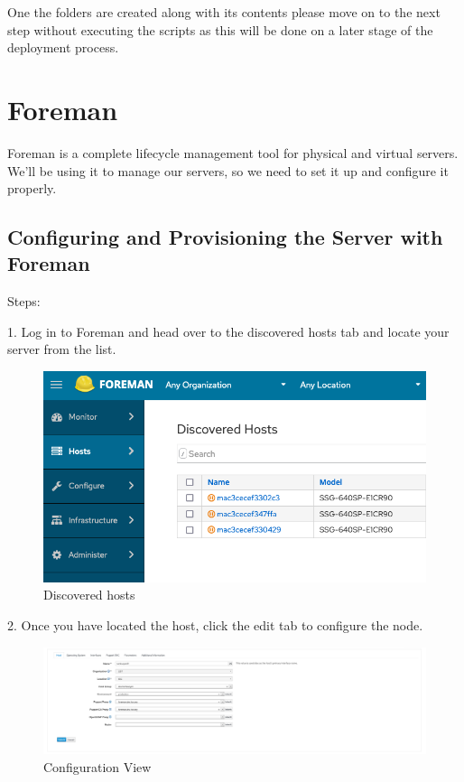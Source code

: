 One the folders are created along with its contents please move on to the next step without executing the scripts as this will be done on a later stage of the deployment process.


\vfill\eject


\section{Foreman}

Foreman is a complete lifecycle management tool for physical and virtual servers. We'll be using it to manage our servers, so we need to set it up and configure it properly.

\subsection{Configuring and Provisioning the Server with Foreman}

Steps:

1. Log in to Foreman and head over to the discovered hosts tab and locate your server from the list.

\begin{figure}
    \includegraphics[width=12cm]{Images/Image11.png}
    \centering
    \caption{Discovered hosts}
\end{figure}

\vfill\eject

2. Once you have located the host, click the edit tab to configure the node.
\vspace{3cm}
\begin{figure}
    \includegraphics[width=14cm]{Images/Image12.png}
    \centering
    \caption{Configuration View}
\end{figure}

